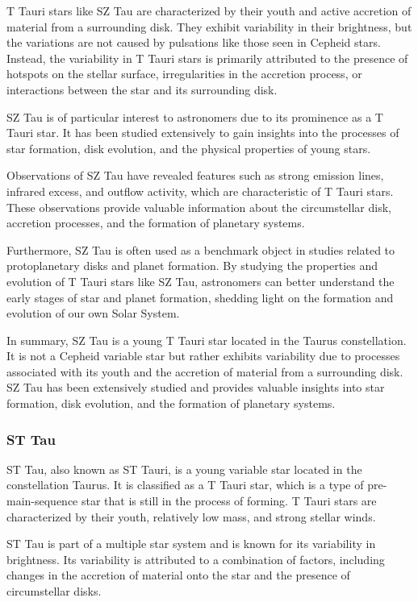 T Tauri stars like SZ Tau are characterized by their youth and active accretion of material from a surrounding disk. They exhibit variability in their brightness, but the variations are not caused by pulsations like those seen in Cepheid stars. Instead, the variability in T Tauri stars is primarily attributed to the presence of hotspots on the stellar surface, irregularities in the accretion process, or interactions between the star and its surrounding disk.

SZ Tau is of particular interest to astronomers due to its prominence as a T Tauri star. It has been studied extensively to gain insights into the processes of star formation, disk evolution, and the physical properties of young stars.

Observations of SZ Tau have revealed features such as strong emission lines, infrared excess, and outflow activity, which are characteristic of T Tauri stars. These observations provide valuable information about the circumstellar disk, accretion processes, and the formation of planetary systems.

Furthermore, SZ Tau is often used as a benchmark object in studies related to protoplanetary disks and planet formation. By studying the properties and evolution of T Tauri stars like SZ Tau, astronomers can better understand the early stages of star and planet formation, shedding light on the formation and evolution of our own Solar System.

In summary, SZ Tau is a young T Tauri star located in the Taurus constellation. It is not a Cepheid variable star but rather exhibits variability due to processes associated with its youth and the accretion of material from a surrounding disk. SZ Tau has been extensively studied and provides valuable insights into star formation, disk evolution, and the formation of planetary systems.



\subsubsection*{ ST Tau }
ST Tau, also known as ST Tauri, is a young variable star located in the constellation Taurus. It is classified as a T Tauri star, which is a type of pre-main-sequence star that is still in the process of forming. T Tauri stars are characterized by their youth, relatively low mass, and strong stellar winds.

ST Tau is part of a multiple star system and is known for its variability in brightness. Its variability is attributed to a combination of factors, including changes in the accretion of material onto the star and the presence of circumstellar disks.

